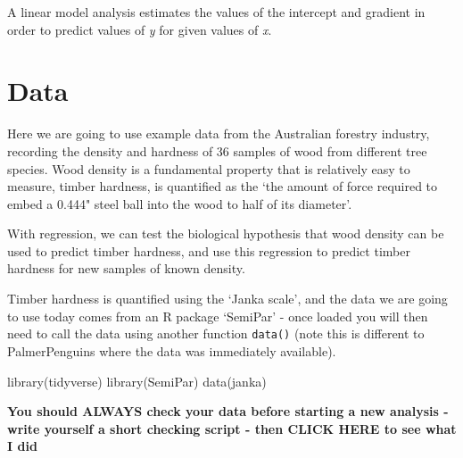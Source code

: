 \documentclass[
]{book}
\newenvironment{Shaded}{\begin{snugshade}}{\end{snugshade}}
\newcommand{\FunctionTok}[1]{\textcolor[rgb]{0.00,0.00,0.00}{#1}}
\newcommand{\NormalTok}[1]{#1}
\begin{document}
A linear model analysis estimates the values of the intercept and gradient in order to predict values of \emph{y} for given values of \emph{x}.

\hypertarget{data}{%
\section{Data}\label{data}}

Here we are going to use example data from the Australian forestry industry, recording the density and hardness of 36 samples of wood from different tree species. Wood density is a fundamental property that is relatively easy to measure, timber hardness, is quantified as the `the amount of force required to embed a 0.444" steel ball into the wood to half of its diameter'.

With regression, we can test the biological hypothesis that wood density can be used to predict timber hardness, and use this regression to predict timber hardness for new samples of known density.

Timber hardness is quantified using the `Janka scale', and the data we are going to use today comes from an R package `SemiPar' - once loaded you will then need to call the data using another function \texttt{data()} (note this is different to PalmerPenguins where the data was immediately available).

\begin{Shaded}
\begin{Highlighting}[]
\FunctionTok{library}\NormalTok{(tidyverse)}
\FunctionTok{library}\NormalTok{(SemiPar)}
\FunctionTok{data}\NormalTok{(janka)}
\end{Highlighting}
\end{Shaded}

\textbf{You should ALWAYS check your data before starting a new analysis - write yourself a short checking script - then CLICK HERE to see what I did}
\end{document}
